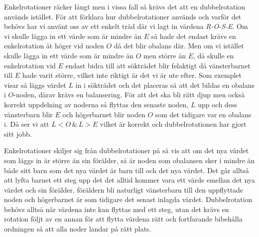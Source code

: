 \documentclass[a5paper,10pt,oneside]{article}
\begin{document}
Enkelrotationer räcker långt men i vissa fall så krävs det att en dubbelrotation används istället. För att förklara hur dubbelrotationer används och varför det behövs har vi använt oss av ett enkelt träd där vi lagt in värdena \textit{R-O-S-E}. Om vi skulle lägga in ett värde som är mindre än $E$ så hade det endast krävs en enkelrotation åt höger vid noden $O$ då det blir obalans där. Men om vi istället skulle lägga in ett värde som är mindre än $O$ men större än $E$, då skulle en enkelrotation vid $E$ endast bidra till att sökträdet blir felaktigt då vänsterbarnet till $E$ hade varit  större, vilket inte riktigt är det vi är ute efter. Som exemplet visar så läggs värdet $L$ in i sökträdet och det placeras så att det bildas en obalans i $O$-noden, därav krävs en balansering. För att det ska bli rätt djup men också korrekt uppdelning av noderna så flyttas den senaste noden, $L$ upp och dess vänsterbarn blir $E$ och högerbarnet blir noden $O$ som det tidigare var en obalans i. Då ser vi att $L < O\, \&\, L > E$ vilket är korrekt och dubbelrotationen har gjort sitt jobb.

Enkelrotationer skiljer sig från dubbelrotationer på så vis att om det nya värdet som läggs in är större än sin förälder, så är noden som obalansen sker i mindre än både sitt barn som det nya värdet är barn till och det nya värdet. Det går alltså att lyfta barnet ett steg upp det det alltid kommer vara ett värde emellan det nya värdet och sin förälder, föräldern bli naturligt vänsterbarn till den uppflyttade noden och högerbarnet är som tidigare det senast inlagda värdet. 
Dubbelrotation behövs alltså när värdena inte kan flyttas med ett steg, utan det krävs en rotation följt av en annan för att flytta värdena rätt och fortfarande bibehålla ordningen så att alla noder landar på rätt plats. 
\end{document}
